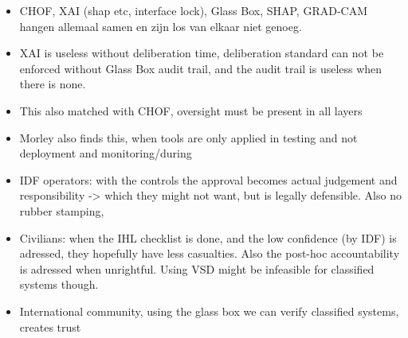 



\begin{itemize}
    \item CHOF, XAI (shap etc, interface lock), Glass Box, SHAP, GRAD-CAM hangen allemaal samen en zijn los van elkaar niet genoeg.
    \item XAI is useless without deliberation time, deliberation standard can not be enforced without Glass Box audit trail, and the audit trail is useless when there is none. 
    \item This also matched with CHOF, oversight must be present in all layers
    \item Morley also finds this, when tools are only applied in testing and not deployment and monitoring/during
\end{itemize}
\begin{itemize}
    \item IDF operators: with the controls the approval becomes actual judgement and responsibility -> which they might not want, but is legally defensible. Also no rubber stamping,
    \item Civilians: when the IHL checklist is done, and the low confidence (by IDF) is adressed, they hopefully have less casualties. Also the post-hoc accountability is adressed when unrightful. Using VSD might be infeasible for classified systems though.
    \item International community, using the glass box we can verify classified systems, creates trust
\end{itemize}

